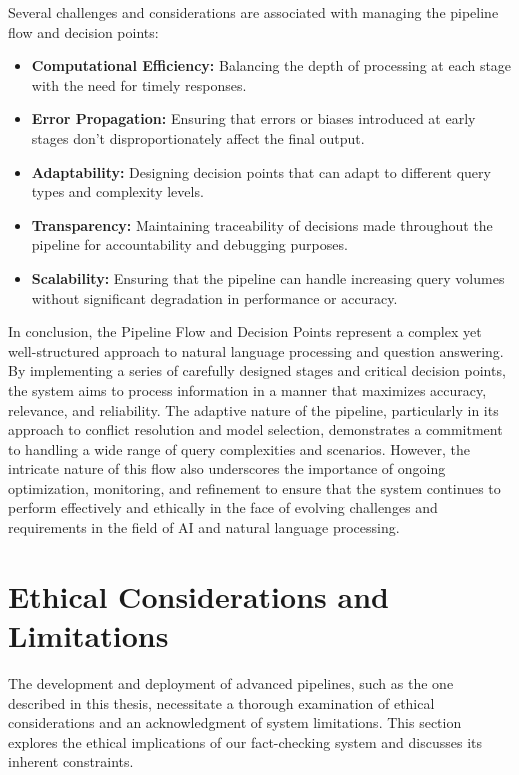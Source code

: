 Several challenges and considerations are associated with managing the pipeline flow and decision points:
\begin{itemize}
    \item \textbf{Computational Efficiency:} Balancing the depth of processing at each stage with the need for timely responses.
    \item \textbf{Error Propagation:} Ensuring that errors or biases introduced at early stages don't disproportionately affect the final output.
    \item \textbf{Adaptability:} Designing decision points that can adapt to different query types and complexity levels.
    \item \textbf{Transparency:} Maintaining traceability of decisions made throughout the pipeline for accountability and debugging purposes.
    \item \textbf{Scalability:} Ensuring that the pipeline can handle increasing query volumes without significant degradation in performance or accuracy.
\end{itemize}

In conclusion, the Pipeline Flow and Decision Points represent a complex yet well-structured approach to natural language processing and question answering.
By implementing a series of carefully designed stages and critical decision points, the system aims to process information in a manner that maximizes accuracy, relevance, and reliability.
The adaptive nature of the pipeline, particularly in its approach to conflict resolution and model selection, demonstrates a commitment to handling a wide range of query complexities and scenarios.
However, the intricate nature of this flow also underscores the importance of ongoing optimization, monitoring, and refinement to ensure that the system continues to perform effectively and ethically in the face of evolving challenges and requirements in the field of AI and natural language processing.

\section{Ethical Considerations and Limitations}\label{sec:ethical-considerations-and-limitations}
The development and deployment of advanced pipelines, such as the one described in this thesis, necessitate a thorough examination of ethical considerations and an acknowledgment of system limitations.
This section explores the ethical implications of our fact-checking system and discusses its inherent constraints.

